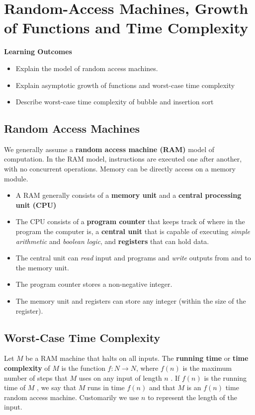 \section{Random-Access Machines, Growth of Functions and Time Complexity}
\begin{mdframed}
	\textbf{Learning Outcomes}
	\begin{itemize}[label={\checkmark}]
		\item Explain the model of random access machines.
		\item Explain asymptotic growth of functions and worst-case time complexity
		\item Describe worst-case time complexity of bubble and insertion sort
	\end{itemize}
	\end{mdframed}

\subsection{Random Access Machines}
We generally assume a \textbf{random access machine (RAM)} model of computation. In the RAM model, instructions are executed one after another, with no concurrent operations. Memory can be directly access on a memory module.

\begin{itemize}
	\item A RAM generally consists of a \textbf{memory unit} and a \textbf{central processing unit (CPU)}
	\item The CPU consists of a \textbf{program counter} that keeps track of where in the program the computer is, a \textbf{central unit} that is capable of executing \emph{simple arithmetic} and \emph{boolean logic}, and \textbf{registers} that can hold data.
	\item The central unit can \emph{read} input and programs and \emph{write} outputs from and to the memory unit.
	\item The program counter stores a non-negative integer.
	\item The memory unit and registers can store any integer (within the size of the register).
\end{itemize}

\subsection{Worst-Case Time Complexity}

Let \( M \) be a RAM machine that halts on all inputs. The \textbf{running time} or \textbf{time complexity} of \( M \) is the function \( f: N \rightarrow N \), where \( f(n) \) is the maximum number of steps that \( M \) uses on any input of length \( n \) . If \( f(n) \) is the running time of \( M \) , we say that \( M \) runs in time \( f(n) \) and that \( M \) is an \( f(n) \) time random access machine. Customarily we use \( n \) to represent the length of the input.


